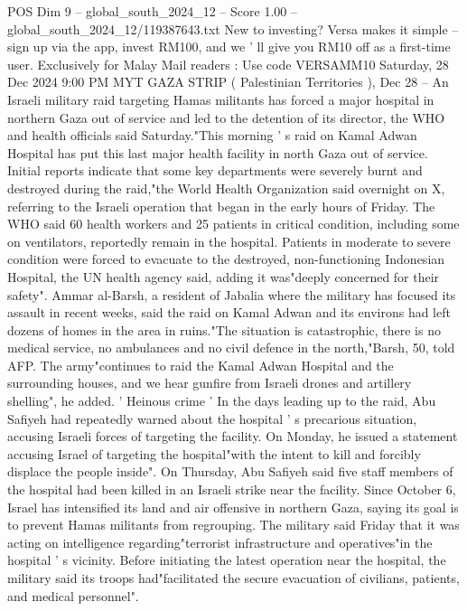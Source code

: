 \begin{textsample}{POS Dim 9 – global\_south\_2024\_12 – Score 1.00 – global\_south\_2024\_12/119387643.txt}  \label{ex:f9_pos_232}
New to investing?
Versa makes it simple -- sign up via the app, invest RM100, and we ' ll give you RM10 off as a first-time user.
Exclusively for Malay Mail readers : Use code VERSAMM10 Saturday, 28 Dec 2024 9:00 PM MYT GAZA STRIP ( Palestinian Territories ), Dec 28 -- An Israeli military raid targeting Hamas militants has forced a major hospital in northern Gaza out of service and led to the detention of its director, the WHO and health officials said Saturday."This morning ' s raid on Kamal Adwan Hospital has put this last major health facility in north Gaza out of service.
Initial reports indicate that some key departments were severely burnt and destroyed during the raid,"the World Health Organization said overnight on X, referring to the Israeli operation that began in the early hours of Friday.
The WHO said 60 health workers and 25 patients in critical condition, including some on ventilators, reportedly remain in the hospital.
Patients in moderate to severe condition were forced to evacuate to the destroyed, non-functioning Indonesian Hospital, the UN health agency said, adding it was"deeply concerned for their safety".
Ammar al-Barsh, a resident of Jabalia where the military has focused its assault in recent weeks, said the raid on Kamal Adwan and its environs had left dozens of homes in the area in ruins."The situation is catastrophic, there is no medical service, no ambulances and no civil defence in the north,"Barsh, 50, told AFP.
The army"continues to raid the Kamal Adwan Hospital and the surrounding houses, and we hear gunfire from Israeli drones and artillery shelling", he added. ' Heinous crime ' In the days leading up to the raid, Abu Safiyeh had repeatedly warned about the hospital ' s precarious situation, accusing Israeli forces of targeting the facility.
On Monday, he issued a statement accusing Israel of targeting the hospital"with the intent to kill and forcibly displace the people inside".
On Thursday, Abu Safiyeh said five staff members of the hospital had been killed in an Israeli strike near the facility.
Since October 6, Israel has intensified its land and air offensive in northern Gaza, saying its goal is to prevent Hamas militants from regrouping.
The military said Friday that it was acting on intelligence regarding"terrorist infrastructure and operatives"in the hospital ' s vicinity.
Before initiating the latest operation near the hospital, the military said its troops had"facilitated the secure evacuation of civilians, patients, and medical personnel".

\end{textsample}
